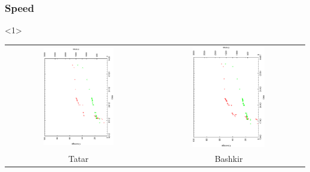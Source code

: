 \documentclass[10pt,xetex]{beamer} %
\begin{document}
\begin{frame}[fragile]
  \frametitle{Speed}

\begin{onlyenv}<1>
\begin{center}
\begin{tabular}{cc}
\includegraphics[angle=270,width=0.5\textwidth]{hist-tt-dec.ps} &  \includegraphics[angle=270,width=0.5\textwidth]{hist-ba-dec.ps} \\
Tatar & Bashkir \\
\end{tabular}
\end{center}
\end{onlyenv}


\end{frame}
\end{document}
